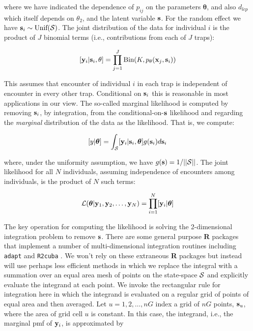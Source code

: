 \documentclass[12pt]{article}
\begin{document}
\begin{spacing}{1.8}
{\flushleft where} we have indicated the dependence of $p_{ij}$ on the parameters
${\bm \theta}$, and also $d_{lcp}$ which
itself depends on $\theta_{2}$, and the latent variable ${\bf s}$.
For the random effect we have ${\bf s}_{i} \sim  \mbox{Unif}({\cal
  S})$.
The joint distribution of the data for individual $i$ is the product
of $J$ binomial terms (i.e., contributions from each of $J$ traps):

\[
  [{\bf y}_{i} | {\bf s}_{i} , \theta] =
  \prod_{j=1}^{J} \mbox{Bin}(K, p_{\theta}({\bf x}_{j},{\bf s}_{i}) )
\]

{\flushleft This} assumes that encounter of individual $i$ in each
trap is independent of encounter in every other trap. Conditional on
${\bf s}_{i}$ this is reasonable in most applications in our view.
 The so-called marginal likelihood is computed by removing
${\bf s}_{i}$, by integration,  from the conditional-on-${\bf s}$
likelihood and regarding the {\it marginal} distribution of the data
as the likelihood. That
is, we compute:

\[
  [y|{\bm \theta}] =
\int_{{\cal S}}  [ {\bf y}_{i} |{\bf s}_{i},{\bm \theta}] g({\bf s}_{i}) d{\bf s}_{i}
\]

{\flushleft where}, under the uniformity assumption, we have
$g({\bf s}) = 1/||{\cal S}||$.
The joint likelihood for all $N$ individuals, assuming independence of
encounters among individuals, is the product of $N$ such terms:

\[
{\cal L}({\bm \theta} | {\bf y}_{1},{\bf y}_{2},\ldots, {\bf y}_{N}) = \prod_{i=1}^{N}
[{\bf y}_{i}|{\bm \theta}]
\]

The key operation for computing the likelihood is solving the
2-dimensional integration problem to remove ${\bf s}$. There are some
general purpose {\bf R} packages that implement a number of
multi-dimensional integration routines including \mbox{\tt adapt}
\citep{genz_etal:2007} and \mbox{\tt R2cuba} \citep{hahn_etal:2011}.
We won't rely on these extraneous {\bf R} packages but instead will
use perhaps less efficient methods in which we replace the integral
with a summation over an equal area mesh of points on the state-space
${\cal S}$ and explicitly evaluate the integrand at each point. We
invoke the rectangular rule for integration here in which the
integrand is evaluated on a regular grid of points of equal area and
then averaged.  Let $u=1,2,\ldots,nG$ index a grid of $nG$ points,
${\bf s}_{u}$, where the area of grid cell $u$ is constant.  In this
case, the integrand, i.e., the marginal pmf of ${\bf y}_{i}$, is
approximated by


\end{spacing}
\end{document}
